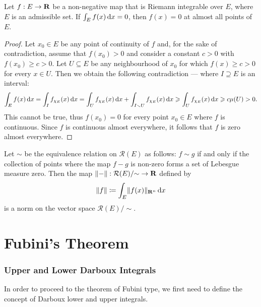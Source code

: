 \begin{lemma}
\label{lem:zero-integral-jordan-measure-zero}
Let \(f: E \to \mathbf{R}\) be a non-negative map that is Riemann integrable over
\(E\), where \(E\) is an admissible set. If \(\int_E f(x)\, \mathrm{d} x = 0\), then
\(f(x) = 0\) at almost all points of \(E\).
\end{lemma}

\begin{proof}
Let \(x_0 \in E\) be any point of continuity of \(f\) and, for the sake of
contradiction, assume that \(f(x_0) > 0\) and consider a constant \(c > 0\) with
\(f(x_0) \geq c > 0\). Let \(U \subseteq E\) be any neighbourhood of \(x_0\) for
which \(f(x) \geq c > 0\) for every \(x \in U\). Then we obtain the following
contradiction --- where \(I \supseteq E\) is an interval:
\[
  \int_E f(x)\, \mathrm{d} x
  = \int_I f_{\chi_{E}}(x)\, \mathrm{d} x
  = \int_U f_{\chi_E}(x)\, \mathrm{d} x
  + \int_{I \smallsetminus U} f_{\chi_{E}}(x)\, \mathrm{d} x
  \geqslant \int_U f_{\chi_{E}}(x)\, \mathrm{d} x
  \geqslant c \mu(U) > 0.
\]
This cannot be true, thus \(f(x_0) = 0\) for every point \(x_0 \in E\) where
\(f\) is continuous. Since \(f\) is continuous almost everywhere, it follows
that \(f\) is zero almost everywhere.
\end{proof}

\begin{corollary}
\label{cor:norm-riemann-integral}
Let \(\sim\) be the equivalence relation on \(\mathcal R(E)\) as follows: \(f
\sim g\) if and only if the collection of points where the map \(f - g\) is
non-zero forms a set of Lebesgue measure zero. Then the map \(\lVert-\rVert:
\mathcal R(E)/{\sim} \to \mathbf{R}\) defined by
\[
  \lVert f\rVert \coloneq \int_E \lVert f(x)\rVert_{\mathbf{R}^n}\, \mathrm{d} x
\]
is a norm on the vector space \(\mathcal R(E)/{\sim}\).
\end{corollary}

\section{Fubini's Theorem}

\subsubsection{Upper and Lower Darboux Integrals}

In order to proceed to the theorem of Fubini type, we first need to define the
concept of Darboux lower and upper integrals.

